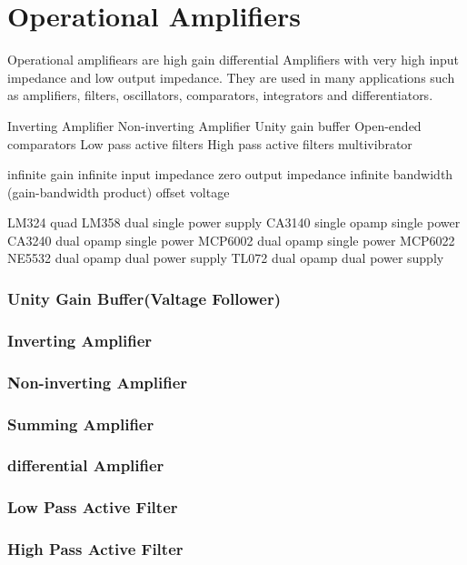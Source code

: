 \chapter{Operational Amplifiers}

Operational amplifiears are high gain differential Amplifiers with very high input impedance and low output impedance. They are used in many applications such as amplifiers, filters, oscillators, comparators, integrators and differentiators.

Inverting Amplifier
Non-inverting Amplifier
Unity gain buffer
Open-ended comparators
Low pass active filters
High pass active filters
multivibrator

infinite gain
infinite input impedance
zero output impedance
infinite bandwidth (gain-bandwidth product)
offset voltage

LM324 quad
LM358 dual single power supply
CA3140 single opamp single power 
CA3240 dual opamp single power
MCP6002 dual opamp single power
MCP6022
NE5532 dual opamp dual power supply 
TL072 dual opamp dual power supply 

\subsection{Unity Gain Buffer(Valtage Follower)}

\subsection{Inverting Amplifier}

\subsection{Non-inverting Amplifier}



\subsection{Summing Amplifier}
\subsection{differential Amplifier}
\subsection{Low Pass Active Filter}
\subsection{High Pass Active Filter}


